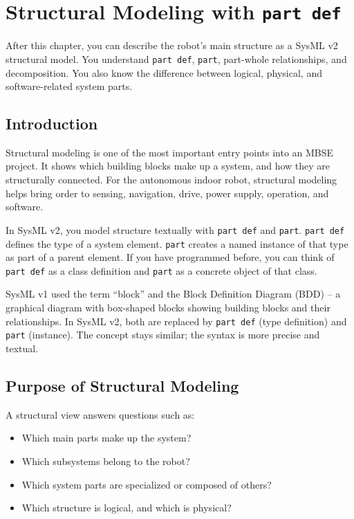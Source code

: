 \chapter{Structural Modeling with \texttt{part def}}

\begin{lernziele}
After this chapter, you can describe the robot's main structure as a SysML v2 structural model. You understand \texttt{part def}, \texttt{part}, part-whole relationships, and decomposition. You also know the difference between logical, physical, and software-related system parts.
\end{lernziele}

\section{Introduction}
Structural modeling is one of the most important entry points into an MBSE project. It shows which building blocks make up a system, and how they are structurally connected. For the autonomous indoor robot, structural modeling helps bring order to sensing, navigation, drive, power supply, operation, and software.

In SysML v2, you model structure textually with \texttt{part def} and \texttt{part}. \texttt{part def} defines the type of a system element. \texttt{part} creates a named instance of that type as part of a parent element. If you have programmed before, you can think of \texttt{part def} as a class definition and \texttt{part} as a concrete object of that class.

\begin{hinweisbox}
SysML v1 used the term \enquote{block} and the Block Definition Diagram (BDD) -- a graphical diagram with box-shaped blocks showing building blocks and their relationships. In SysML v2, both are replaced by \texttt{part def} (type definition) and \texttt{part} (instance). The concept stays similar; the syntax is more precise and textual.
\end{hinweisbox}

\section{Purpose of Structural Modeling}
A structural view answers questions such as:

\begin{itemize}
    \item Which main parts make up the system?
    \item Which subsystems belong to the robot?
    \item Which system parts are specialized or composed of others?
    \item Which structure is logical, and which is physical?
\end{itemize}

